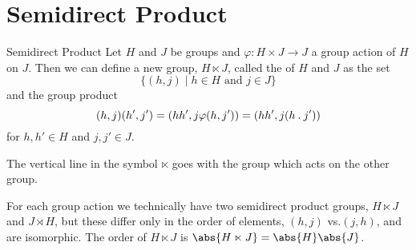 \section{Semidirect Product}
\begin{dfn}{Semidirect Product}{}
    Let \(H\) and \(J\) be groups and \(\varphi \colon H \times J \to J\) a group action of \(H\) on \(J\).
    Then we can define a new group, \(H \ltimes J\), called the  of \(H\) and \(J\) as the set
    \begin{equation}
        \{(h, j) \mid h \in H \text{ and } j \in J\}
    \end{equation}
    and the group product
    \begin{equation}
        (h, j)(h', j') = (hh', j\varphi(h, j')) = (hh', j(h\mathbin{.} j'))
    \end{equation}
    for \(h, h' \in H\) and \(j, j' \in J\).
    \begin{rmk}
        The vertical line in the symbol \(\ltimes\) goes with the group which acts on the other group.
    \end{rmk}
\end{dfn}

For each group action we technically have two semidirect product groups, \(H \ltimes J\) and \(J \rtimes H\), but these differ only in the order of elements, \((h, j)\) vs.\@ \((j, h)\), and are isomorphic.
The order of \(H \ltimes J\) is \(\abs{H \ltimes J} = \abs{H}\abs{J}\).

